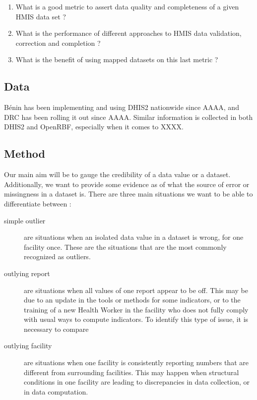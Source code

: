 \begin{enumerate}
	\item What is a good metric to assert data quality and completeness of a given HMIS data set ?
	\item What is the performance of different approaches to HMIS data validation, correction and completion ?
	\item What is the benefit of using mapped datasets on this last metric ?
\end{enumerate}

\subsection{Data}
\label{paper2_data}

Bénin has been implementing and using DHIS2 nationwide since AAAA, and DRC has been rolling it out since AAAA. Similar information is collected in both DHIS2 and OpenRBF, especially when it comes to XXXX.


\subsection{Method}

Our main aim will be to gauge the credibility of a data value or a dataset.  Additionally, we want to provide some evidence as of what the source of error or missingness in a dataset is. There are three main situations we want to be able to differentiate between :
\begin{description}
	\item[simple outlier] are situations when an isolated data value in a dataset is wrong, for one facility once. These are the situations that are the most commonly recognized as outliers.
	\item[outlying report] are situations when all values of one report appear to be off. This may be due to an update in the tools or methods for some indicators, or to the training of a new Health Worker in the facility who does not fully comply with usual ways to compute indicators. To identify this type of issue, it is necessary to compare
	\item[outlying facility] are situations when one facility is consistently reporting numbers that are different from surrounding facilities. This may happen when structural conditions in one facility are leading to discrepancies in data collection, or in data computation.
\end{description}

